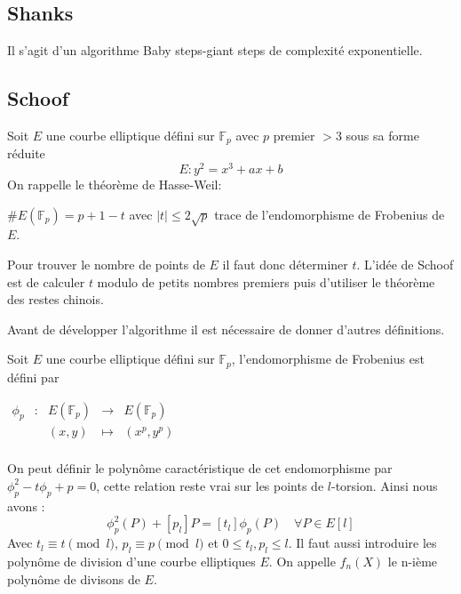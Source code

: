\documentclass{article}
\begin{document}
\subsection{Shanks}
Il s'agit d'un algorithme Baby steps-giant steps de complexité exponentielle.

\subsection{Schoof}
Soit $E$ une courbe elliptique défini sur $\mathbb{F}_p$ avec $p$ premier $>3$ sous sa forme réduite 
$$ E: y^2 = x^3 + ax+b$$
On rappelle le théorème de Hasse-Weil:

\begin{thm}
$\#E(\mathbb{F}_p) = p + 1 - t$ avec $|t| \leq 2 \sqrt{p}$ trace de l'endomorphisme de Frobenius de $E$.
\end{thm}
Pour trouver le nombre de points de $E$ il faut donc déterminer $t$. 
L'idée de Schoof est de calculer $t$ modulo de petits nombres premiers puis d'utiliser le théorème des restes chinois. 

Avant de développer l'algorithme il est nécessaire de donner d'autres définitions. 

\begin{defi}[Frobenius]
Soit $E$ une courbe elliptique défini sur $\mathbb{F}_p$, l'endomorphisme de Frobenius est défini par 

$\begin{array}{ccccc}
\phi_p & : & E(\mathbb{F}_p) & \to & E(\mathbb{F}_p) \\
 & & (x,y) & \mapsto & (x^p, y^p) \\
\end{array}$
\end{defi}
On peut définir le polynôme caractéristique de cet endomorphisme par $\phi_p^2 - t \phi_p + p = 0$, cette relation reste vrai sur les points de $l$-torsion. Ainsi nous avons : 
\begin{equation}
\label{eqnfrobenius}
 \phi_p^2(P)  + [p_l]P = [t_{l}] \phi_p(P) \quad \forall P \in E[l]
\end{equation} 
Avec $t_l \equiv t \pmod l$, $p_l \equiv p \pmod l$ et $0 \leq t_l, p_l \leq l$.
Il faut aussi introduire les polynôme de division d'une courbe elliptiques $E$. On appelle $f_n(X)$ le n-ième polynôme de divisons de $E$.
\end{document}
